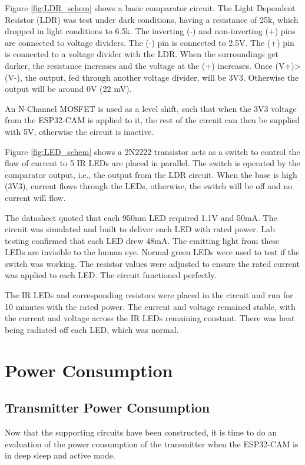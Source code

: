 \documentclass[class=report,11pt,crop=false]{standalone}
\begin{document}
Figure \ref{fig:LDR_schem} shows a basic comparator circuit. The Light Dependent Resistor (LDR) was test under dark conditions, having a resistance of 25k, which dropped in light conditions to 6.5k. The inverting (-) and non-inverting (+) pins are connected to voltage dividers. The (-) pin is connected to 2.5V. The (+) pin is connected to a voltage divider with the LDR. When the surroundings get darker, the resistance increases and the voltage at the (+) increases. Once (V+)>(V-), the output, fed through another voltage divider, will be 3V3. Otherwise the output will be around 0V (22 mV). 

An N-Channel MOSFET is used as a level shift, such that when the 3V3 voltage from the ESP32-CAM is applied to it, the rest of the circuit can then be supplied with 5V, otherwise the circuit is inactive.

Figure \ref{fig:LED_schem} shows a 2N2222 transistor acts as a switch to control the flow of current to 5 IR LEDs are placed in parallel. The switch is operated by the comparator output, i.e., the output from the LDR circuit. When the base is high (3V3), current flows through the LEDs, otherwise, the switch will be off and no current will flow. 

The datasheet quoted that each 950nm LED required 1.1V and 50mA. The circuit was simulated and built to deliver each LED with rated power. Lab testing confirmed that each LED drew 48mA. The emitting light from these LEDs are invisible to the human eye. Normal green LEDs were used to test if the switch was working. The resistor values were adjusted to ensure the rated current was applied to each LED. The circuit functioned perfectly. 

The IR LEDs and corresponding resistors were placed in the circuit and run for 10 minutes with the rated power. The current and voltage remained stable, with the current and voltage across the IR LEDs remaining constant. There was heat being radiated off each LED, which was normal. 

\section{Power Consumption}
\subsection{Transmitter Power Consumption}
Now that the supporting circuits have been constructed, it is time to do an evaluation of the power consumption of the transmitter when the ESP32-CAM is in deep sleep and active mode. 
\end{document}

